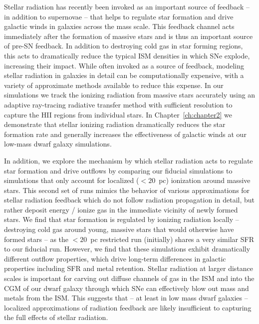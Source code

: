Stellar radiation has recently been invoked as an important source of feedback -- in addition to supernovae -- that helps to regulate star formation and drive galactic winds in galaxies across the mass scale. This feedback channel acts immediately after the formation of massive stars and is thus an important source of pre-SN feedback. In addition to destroying cold gas in star forming regions, this acts to dramatically reduce the typical ISM densities in which SNe explode, increasing their impact. While often invoked as a source of feedback, modeling stellar radiation in galaxies in detail can be computationally expensive, with a variety of approximate methods available to reduce this expense. In our simulations we track the ionizing radiation from massive stars accurately using an adaptive ray-tracing radiative transfer method with sufficient resolution to capture the HII regions from individual stars. In Chapter~\ref{ch:chapter2} we demonstrate that stellar ionizing radiation dramatically reduces the star formation rate and generally increases the effectiveness of galactic winds at our low-mass dwarf galaxy simulations.

In addition, we explore the mechanism by which stellar radiation acts to regulate star formation and drive outflows by comparing our fiducial simulations to simulations that only account for localized ($< 20$~pc) ionization around massive stars. This second set of runs mimics the behavior of various approximations for stellar radiation feedback which do not follow radiation propagation in detail, but rather deposit energy / ionize gas in the immediate vicinity of newly formed stars. We find that star formation is regulated by ionizing radiation locally -- destroying cold gas around young, massive stars that would otherwise have formed stars -- as the $< 20$~pc restricted run (initially) shares a very similar SFR to our fiducial run. However, we find that these simulations exhibit dramatically different outflow properties, which drive long-term differences in galactic properties including SFR and metal retention. Stellar radiation at larger distance scales is important for carving out diffuse channels of gas in the ISM and into the CGM of our dwarf galaxy through which SNe can effectively blow out mass and metals from the ISM. This suggests that -- at least in low mass dwarf galaxies -- localized approximations of radiation feedback are likely insufficient to capturing the full effects of stellar radiation.


